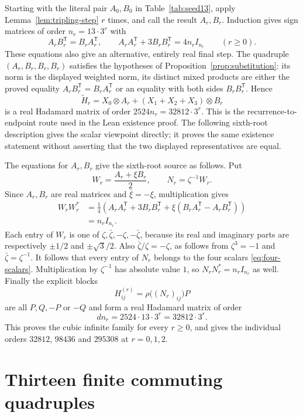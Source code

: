 \documentclass[10pt]{article}
\begin{document}
Starting with the literal pair $A_0,B_0$ in Table~\ref{tab:seed13},
apply Lemma~\ref{lem:tripling-step} $r$ times, and call the result
$A_r,B_r$. Induction gives sign matrices of order $n_r=13\cdot3^r$
with
\[
 A_rB_r^{\mathsf T}=B_rA_r^{\mathsf T},\qquad
 A_rA_r^{\mathsf T}+3B_rB_r^{\mathsf T}=4n_rI_{n_r}
 \qquad(r\geq0).
\]
These equations also give an alternative, entirely real final step.
The quadruple $(A_r,B_r,B_r,B_r)$ satisfies the hypotheses of
Proposition~\ref{prop:substitution}: its norm is the displayed weighted
norm, its distinct mixed products are either the proved equality
$A_rB_r^{\mathsf T}=B_rA_r^{\mathsf T}$ or an equality with both sides
$B_rB_r^{\mathsf T}$. Hence
\[
 \widetilde H_r=X_0\otimes A_r+(X_1+X_2+X_3)\otimes B_r
\]
is a real Hadamard matrix of order $2524n_r=32812\cdot3^r$.
This is the recurrence-to-endpoint route used in the Lean existence
proof. The following sixth-root description gives the scalar viewpoint
directly; it proves the same existence statement without asserting that
the two displayed representatives are equal.

The equations for $A_r,B_r$ give the sixth-root source as follows.
Put
\[
 W_r=\frac{A_r+\xi B_r}{2},\qquad N_r=\zeta^{-1}W_r.
\]
Since $A_r,B_r$ are real matrices and $\bar\xi=-\xi$, multiplication
gives
\begin{align*}
 W_rW_r^*
 &=\frac14\left(A_rA_r^{\mathsf T}+3B_rB_r^{\mathsf T}
       +\xi(B_rA_r^{\mathsf T}-A_rB_r^{\mathsf T})\right)\\
 &=n_rI_{n_r}.
\end{align*}
Each entry of $W_r$ is one of
$\zeta,\bar\zeta,-\zeta,-\bar\zeta$, because its real and imaginary
parts are respectively $\pm1/2$ and $\pm\sqrt3/2$.
Also $\bar\zeta/\zeta=-\zeta$, as follows from
$\zeta^3=-1$ and $\bar\zeta=\zeta^{-1}$. It follows that every entry
of $N_r$ belongs to the four scalars \eqref{eq:four-scalars}.
Multiplication by $\zeta^{-1}$ has absolute value $1$, so
$N_rN_r^*=n_rI_{n_r}$ as well. Finally the explicit blocks
\[
 H^{(r)}_{ij}=\rho\bigl((N_r)_{ij}\bigr)P
\]
are all $P,Q,-P$ or $-Q$ and form a real Hadamard matrix of order
\[
 d n_r=2524\cdot13\cdot3^r=32812\cdot3^r.
\]
This proves the cubic infinite family for every $r\geq0$, and gives
the individual orders $32812$, $98436$ and $295308$ at $r=0,1,2$.


\section{Thirteen finite commuting quadruples}\label{sec:williamson}
\end{document}

